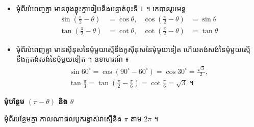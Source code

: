 \begin{note}[សម្គាល់]
\begin{itemize}
  \item មុំពីរបំពេញគ្នា មានចុងឆ្លុះគ្នាធៀបនឹងបន្ទាត់ពុះទី $1$ ។ គេបានរូបមន្ត
  \[
  \begin{aligned}
  \sin\left(\frac{\pi}{2} - \theta\right) &= \cos\theta, & \cos\left(\frac{\pi}{2} - \theta\right) &= \sin\theta\\
  \tan\left(\frac{\pi}{2} - \theta\right) &= \cot\theta, & \cot\left(\frac{\pi}{2} - \theta\right) &= \tan\theta
  \end{aligned}
  \]
  \item មុំពីរបំពេញគ្នា មានស៊ីនុសនៃមុំមួយស្មើនឹងកូស៊ីនុសនៃមុំមួយទៀត ហើយតង់សង់នៃមុំមួយស្មើនឹងកូតង់សង់នៃមុំមួយទៀត ។ ឧទាហរណ៍ ៖
  \[
\begin{gathered}
\sin 60^\circ = \cos(90^\circ - 60^\circ) = \cos 30^\circ = \frac{\sqrt{3}}{2},\\
\tan\frac{\pi}{3} = \tan\left(\frac{\pi}{2} - \frac{\pi}{6}\right) = \cot\frac{\pi}{6} = \sqrt{3} \text{ ។}
\end{gathered}
\]
\end{itemize}
\end{note}

\textbf{មុំបន្ថែម $(\pi - \theta)$ និង $\theta$}

មុំពីរបន្ថែមគ្នា កាលណាផលបូករង្វាស់វាស្មើនឹង $\pi$ តាម $2\pi$ ។

